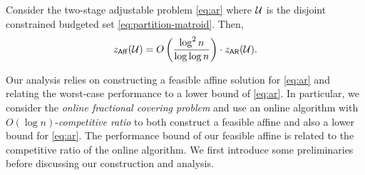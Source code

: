 \documentclass[moor]{informs1}              %
\begin{document}
\begin{theorem}\label{thm:partition-matroid}
Consider the two-stage adjustable problem \eqref{eq:ar} where $ {\cal U}$ is the disjoint constrained budgeted  set \eqref{eq:partition-matroid}.  Then,
$$ z_{\sf Aff}({\cal U}) = O\left( \frac{\log^2 n }{\log \log n} \right)\cdot z_{\sf AR}({\cal U}) .$$
\end{theorem}

Our analysis relies on constructing a feasible affine solution for \eqref{eq:ar} and relating the worst-case performance to a lower bound of \eqref{eq:ar}. In particular, we consider the {\em online fractional covering problem} and use an online algorithm with $O(\log n)$-{\em competitive ratio} to both construct a feasible affine and also a lower bound for \eqref{eq:ar}. The performance bound of our feasible affine is related to the competitive ratio of the online algorithm. We first introduce some preliminaries before discussing our construction and analysis. 


\end{document}
